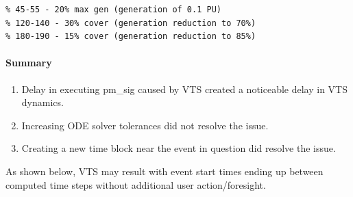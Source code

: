\documentclass[12pt]{article}
\begin{document}
\begin{center}
\begin{minipage}{.47\linewidth}
\begin{itemize}
\begin{Verbatim}[fontsize=\scriptsize]
% cloud cover events
% 45-55 - 20% max gen (generation of 0.1 PU)
% 120-140 - 30% cover (generation reduction to 70%)
% 180-190 - 15% cover (generation reduction to 85%)
\end{Verbatim}
\end{itemize}
\end{minipage}

\end{center}

\paragraph{Summary} 
\begin{enumerate}
\item Delay in executing pm\_sig caused by VTS created a noticeable delay in VTS dynamics.
\item Increasing ODE solver tolerances did not resolve the issue.
\item Creating a new time block near the event in question did resolve the issue.
\end{enumerate}
As shown below, VTS may result with event start times ending up between computed time steps without additional user action/foresight.\\
\end{document}
